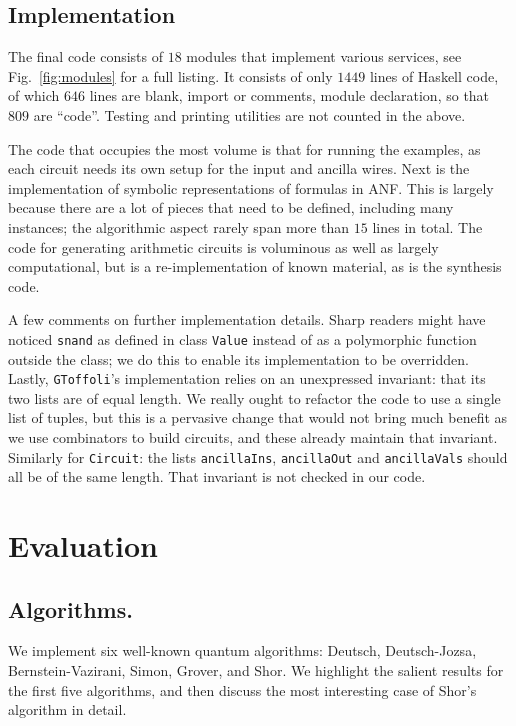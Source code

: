 \documentclass[sigplan,review]{acmart}
\begin{document}
\subsection{Implementation}

The final code consists of $18$ modules that implement various
services, see Fig.~\ref{fig:modules} for a full listing. It consists of
only $1449$ lines of Haskell code, of which $646$ lines are blank, import or
comments, module declaration, so that $809$ are ``code''. Testing and printing
utilities are not counted in the above.

The code that occupies the most volume is that for running the examples, as each
circuit needs its own setup for the input and ancilla wires. Next is the implementation
of symbolic representations of formulas in ANF. This is largely because there are a
lot of pieces that need to be defined, including many instances; the algorithmic aspect
rarely span more than $15$ lines in total. The code for generating arithmetic circuits
is voluminous as well as largely computational, but is a re-implementation of known
material, as is the synthesis code.

A few comments on further implementation details. Sharp readers might have noticed
\texttt{snand} as defined in class \texttt{Value} instead of as a polymorphic function
outside the class; we do this to enable its implementation to be overridden.
Lastly, \texttt{GToffoli}'s implementation relies on an unexpressed invariant: that its
two lists are of equal length. We really ought to refactor the code to use a single
list of tuples, but this is a pervasive change that would not bring much benefit as
we use combinators to build circuits, and these already maintain that invariant.
Similarly for \texttt{Circuit}: the lists \texttt{ancillaIns}, \texttt{ancillaOut}
and \texttt{ancillaVals} should all be of the same length. That invariant is not
checked in our code.


\section{Evaluation}

\subsection*{Algorithms.} 

We implement six well-known quantum algorithms: 
Deutsch, Deutsch-Jozsa, Bernstein-Vazirani, Simon, Grover, and Shor. 
We highlight the salient results for the
first five algorithms, and then discuss the most interesting case of
Shor's algorithm in detail.
\end{document}
